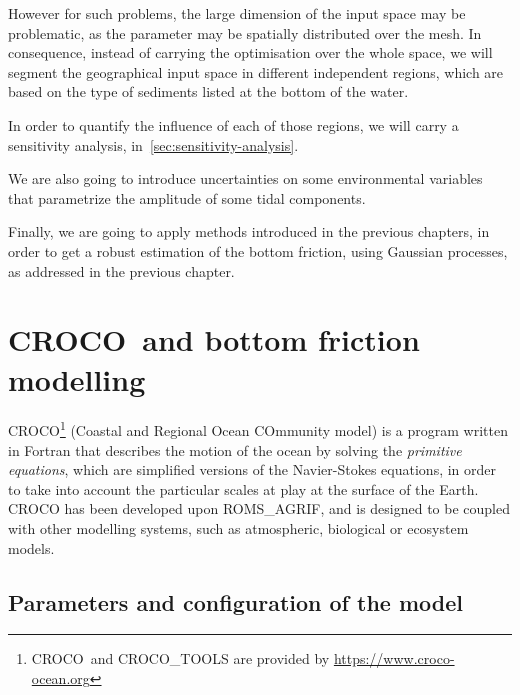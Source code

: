 \documentclass[../../Main_ManuscritThese.tex]{subfiles}
\newcommand{\CROCO}{CROCO}
\begin{document}
However for such problems, the large dimension of the input space may
be problematic, as the parameter may be spatially distributed over the
mesh. In consequence, instead of carrying the optimisation over the
whole space, we will segment the geographical input space in different
independent regions, which are based on the type of sediments listed
at the bottom of the water.

In order to quantify the influence of each of those regions, we will
carry a sensitivity analysis, in~\cref{sec:sensitivity-analysis}.

We are also going to introduce uncertainties on some environmental
variables that parametrize the amplitude of some tidal components. 

Finally, we are going to apply methods introduced in the previous
chapters, in order to get a robust estimation of the bottom friction,
using Gaussian processes, as addressed in the previous chapter.



\section{\CROCO\ and bottom friction modelling}
\label{sec:croco_bottom_fr}
\CROCO{}\footnote{\CROCO\ and CROCO\_TOOLS are provided by
  \url{https://www.croco-ocean.org}} (Coastal and Regional Ocean
COmmunity model) is a program written in Fortran that describes the
motion of the ocean by solving the \emph{primitive equations}, which
are simplified versions of the Navier-Stokes equations, in order to
take into account the particular scales at play at the surface of the
Earth. \CROCO{} has been developed upon ROMS\_AGRIF, and is designed
to be coupled with other modelling systems, such as atmospheric,
biological or ecosystem models.



\subsection{Parameters and configuration of the model}
\label{sec:geographical_setting}
\end{document}
